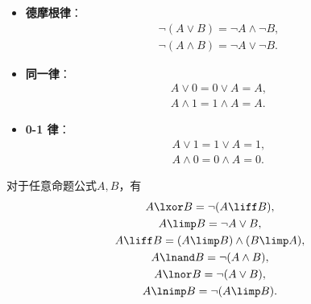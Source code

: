 \begin{theorem}
\begin{itemize}
	\item {\rm\bf 德摩根律}：\begin{gather}
		\neg(A \lor B) = \neg A \land \neg B, \\
		\neg(A \land B) = \neg A \lor \neg B.
	\end{gather}

	\item {\rm\bf 同一律}：\begin{gather}
		A \lor 0 = 0 \lor A = A, \\
		A \land 1 = 1 \land A = A.
	\end{gather}

	\item {\rm\bf 0-1 律}：\begin{gather}
		A \lor 1 = 1 \lor A = 1, \\
		A \land 0 = 0 \land A = 0.
	\end{gather}
\end{itemize}
\end{theorem}

\begin{theorem}
对于任意命题公式\(A,B\)，有\begin{gather}
	A \lxor B
	= \neg(A \liff B),
		\label{equation:数理逻辑.联结词等值式1} \\
	A \limp B
	= \neg A \lor B,
		\label{equation:数理逻辑.联结词等值式2} \\
	A \liff B
	= (A \limp B) \land (B \limp A),
		\label{equation:数理逻辑.联结词等值式3} \\
	A \lnand B
	= \neg(A \land B),
		\label{equation:数理逻辑.联结词等值式4} \\
	A \lnor B
	= \neg(A \lor B),
		\label{equation:数理逻辑.联结词等值式5} \\
	A \lnimp B
	= \neg(A \limp B).
		\label{equation:数理逻辑.联结词等值式6}
\end{gather}
\end{theorem}

